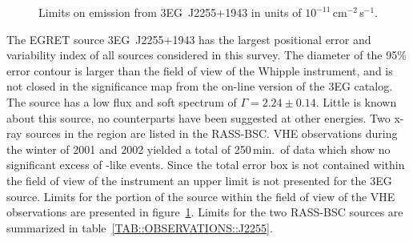 \begin{figure}[b]
\centerline{}
\caption{\label{FIG::OBSERVATIONS::J2255} Limits on 
emission from 3EG~J2255$+$1943 in units of
$10^{-11}$\,cm$^{-2}$\,s$^{-1}$.}
\end{figure}

The EGRET source 3EG~J2255$+$1943 has the largest positional error and
variability index of all sources considered in this survey. The
diameter of the 95\% error contour is larger than the field of view of
the Whipple instrument, and is not closed in the significance map from
the on-line version of the 3EG catalog. The source has a low flux and
soft spectrum of $\Gamma=2.24\pm0.14$. Little is known about this
source, no counterparts have been suggested at other energies. Two
x-ray sources in the region are listed in the RASS-BSC. VHE
observations during the winter of 2001 and 2002 yielded a total of
250\,min.\ of data which show no significant excess of {\Grayc}-like
events. Since the total error box is not contained within the field of
view of the instrument an upper limit is not presented for the 3EG
source. Limits for the portion of the source within the field of view
of the VHE observations are presented in
figure~\ref{FIG::OBSERVATIONS::J2255}. Limits for the two RASS-BSC
sources are summarized in table~\ref{TAB::OBSERVATIONS::J2255}.

